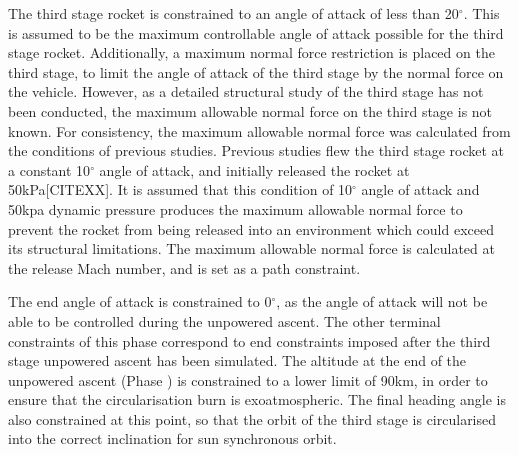 The third stage rocket is constrained to an angle of attack of less than 20$^\circ$. This is assumed to be the maximum controllable angle of attack possible for the third stage rocket.   
Additionally, a maximum normal force restriction is placed on the third stage, to limit the angle of attack of the third stage by the normal force on the vehicle. However, as a detailed structural study of the third stage has not been conducted, the maximum allowable normal force on the third stage is not known.
For consistency, the maximum allowable normal force was calculated from the conditions of previous studies. Previous studies flew the third stage rocket at a constant 10$^\circ$ angle of attack, and initially released the rocket at 50kPa[CITEXX]. 
It is assumed that this condition of 10$^\circ$ angle of attack and 50kpa dynamic pressure produces the maximum allowable normal force to prevent the rocket from being released into an environment which could exceed its structural limitations. The maximum allowable normal force is calculated at the release Mach number, and is set as a path constraint. 

The end angle of attack is constrained to 0$^\circ$, as the angle of attack will not be able to be controlled during the unpowered ascent. 
The other terminal constraints of this phase correspond to end constraints imposed after the third stage unpowered ascent has been simulated. The altitude at the end of the unpowered ascent (Phase ) is constrained to a lower limit of 90km, in order to ensure that the circularisation burn is exoatmospheric. The final heading angle is also constrained at this point, so that the orbit of the third stage is circularised into the correct inclination for sun synchronous orbit. 

